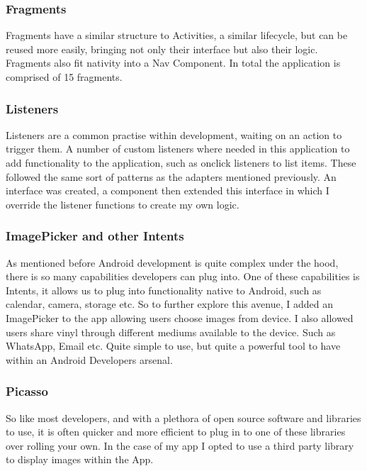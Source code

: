 \subsubsection{ Fragments }
Fragments have a similar structure to Activities, a similar lifecycle, but can be reused more easily, bringing not only their interface but also their logic. Fragments also fit nativity into a Nav Component. In total the application is comprised of 15 fragments.

\subsubsection{ Listeners }
Listeners are a common practise within development, waiting on an action to trigger them. A number of custom listeners where needed in this application to add functionality to the application, such as onclick listeners to list items. These followed the same sort of patterns as the adapters mentioned previously. An interface was created, a component then extended this interface in which I override the listener functions to create my own logic. 

\subsubsection{ ImagePicker and other Intents }
As mentioned before Android development is quite complex under the hood, there is so many capabilities developers can plug into. One of these capabilities is Intents, it allows us to plug into functionality native to Android, such as calendar, camera, storage etc. So to further explore this avenue, I added an ImagePicker to the app allowing users choose images from device. I also allowed users share vinyl through different mediums available to the device. Such as WhatsApp, Email etc. Quite simple to use, but quite a powerful tool to have within an Android Developers arsenal. 

\subsubsection{ Picasso }
So like most developers, and with a plethora of open source software and libraries to use, it is often quicker and more efficient to plug in to one of these libraries over rolling your own. In the case of my app I opted to use a third party library to display images within the App.

